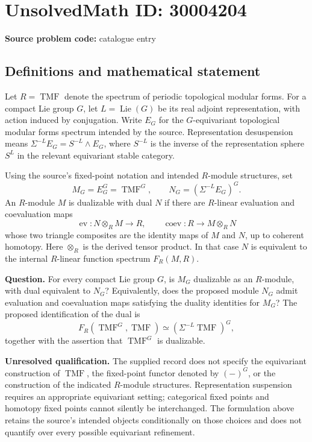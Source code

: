 \documentclass[11pt]{article}
\begin{document}
\section*{UnsolvedMath ID: 30004204}
\textbf{Source problem code:} catalogue entry
\subsection{Definitions and mathematical statement}
Let \(R=\operatorname{TMF}\) denote the spectrum of periodic topological modular forms. For a compact Lie group \(G\), let \(L=\operatorname{Lie}(G)\) be its real adjoint representation, with action induced by conjugation. Write \(E_G\) for the \(G\)-equivariant topological modular forms spectrum intended by the source. Representation desuspension means \(\Sigma^{-L}E_G=S^{-L}\wedge E_G\), where \(S^{-L}\) is the inverse of the representation sphere \(S^L\) in the relevant equivariant stable category.

Using the source's fixed-point notation and intended \(R\)-module structures, set
\[
M_G=E_G^G=\operatorname{TMF}^G,
\qquad
N_G=(\Sigma^{-L}E_G)^G.
\]
An \(R\)-module \(M\) is dualizable with dual \(N\) if there are \(R\)-linear evaluation and coevaluation maps
\[
\operatorname{ev}:N\otimes_R M\longrightarrow R,
\qquad
\operatorname{coev}:R\longrightarrow M\otimes_R N
\]
whose two triangle composites are the identity maps of \(M\) and \(N\), up to coherent homotopy. Here \(\otimes_R\) is the derived tensor product. In that case \(N\) is equivalent to the internal \(R\)-linear function spectrum \(F_R(M,R)\).

\textbf{Question.} For every compact Lie group \(G\), is \(M_G\) dualizable as an \(R\)-module, with dual equivalent to \(N_G\)? Equivalently, does the proposed module \(N_G\) admit evaluation and coevaluation maps satisfying the duality identities for \(M_G\)? The proposed identification of the dual is
\[
F_R(\operatorname{TMF}^G,\operatorname{TMF})
\simeq
(\Sigma^{-L}\operatorname{TMF})^G,
\]
together with the assertion that \(\operatorname{TMF}^G\) is dualizable.

\textbf{Unresolved qualification.} The supplied record does not specify the equivariant construction of \(\operatorname{TMF}\), the fixed-point functor denoted by \((-)^G\), or the construction of the indicated \(R\)-module structures. Representation suspension requires an appropriate equivariant setting; categorical fixed points and homotopy fixed points cannot silently be interchanged. The formulation above retains the source's intended objects conditionally on those choices and does not quantify over every possible equivariant refinement.
\end{document}
